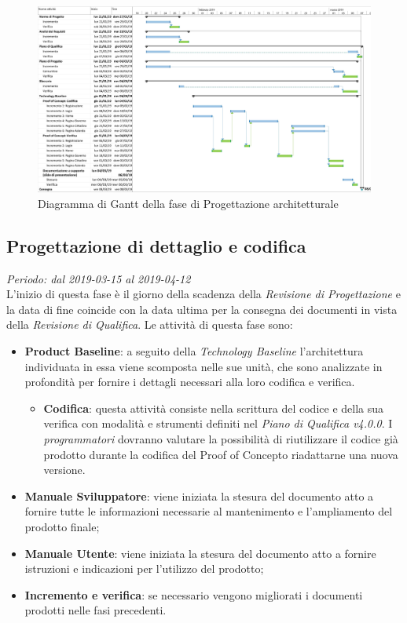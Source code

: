 \begin{figure}[H]
	\includegraphics[width=0.99\linewidth]{res/images/gantt_pa.jpg}
	\caption{Diagramma di Gantt della fase di Progettazione architetturale}
\end{figure}


\subsection{Progettazione di dettaglio e codifica}
\textit{Periodo: dal 2019-03-15 al 2019-04-12} \\
L'inizio di questa fase è il giorno della scadenza della \textit{Revisione di 
Progettazione} e la data di fine coincide con la data ultima per la consegna dei documenti 
in vista della \textit{Revisione di Qualifica}. Le attività di questa fase sono:
\begin{itemize}
	\item \textbf{Product Baseline}: a seguito della \textit{Technology 
	Baseline} l'architettura individuata in essa viene scomposta nelle sue unità,
	che sono analizzate in profondità per fornire i dettagli necessari alla loro codifica e verifica. 
	\begin{itemize}
		\item \textbf{Codifica}: questa attività consiste nella scrittura del 
		codice e della sua verifica con modalità e strumenti definiti nel 
		\textit{Piano di Qualifica v4.0.0}. I \textit{programmatori} dovranno valutare
		la possibilità di riutilizzare il codice già prodotto durante la codifica del 
		Proof of Concept\glosp o riadattarne una nuova versione.
	\end{itemize}
	\item \textbf{Manuale Sviluppatore}: viene iniziata la stesura del documento 
	atto a fornire tutte le informazioni necessarie al mantenimento e 
	l'ampliamento del prodotto finale;
	\item \textbf{Manuale Utente}: viene iniziata la stesura del documento
	atto a fornire istruzioni e indicazioni per l'utilizzo del prodotto;
	\item \textbf{Incremento e verifica}: se necessario vengono migliorati i 
	documenti prodotti nelle fasi precedenti.
\end{itemize}

